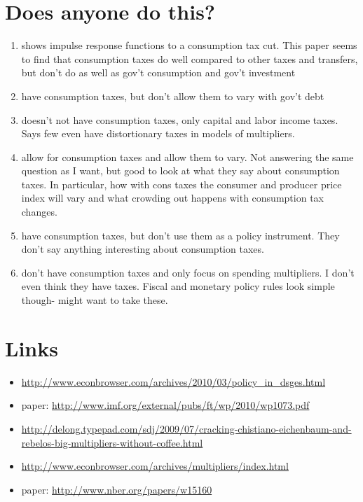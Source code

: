 \documentclass[article,11pt,letterpaper,fleqn]{article}
\theoremstyle{definition}
\numberwithin{equation}{section}
\newcommand{\cn}{\citeasnoun} %
\begin{document}
\section{Does anyone do this?}
\begin{enumerate}
\item \cn{IMF2010} shows impulse response functions to a consumption tax cut.  This paper seems to find that consumption taxes do well compared to other taxes and transfers, but don't do as well as gov't consumption and gov't investment
\item \cn{LPT2010} have consumption taxes, but don't allow them to vary with gov't debt
\item \cn{Zubairy2010} doesn't not have consumption taxes, only capital and labor income taxes.  Says few even have distortionary taxes in models of multipliers.
\item \cn{TY2010} allow for consumption taxes and allow them to vary.  Not answering the same question as I want, but good to look at what they say about consumption taxes.  In particular, how with cons taxes the consumer and producer price index will vary and what crowding out happens with consumption tax changes.
\item \cn{SC2005} have consumption taxes, but don't use them as a policy instrument.  They don't say anything interesting about consumption taxes.
\item \cn{CER2010} don't have consumption taxes and only focus on spending multipliers.  I don't even think they have taxes.  Fiscal and monetary policy rules look simple though- might want to take these.
\end{enumerate}


\section{Links}
\begin{itemize}
\item \url{http://www.econbrowser.com/archives/2010/03/policy_in_dsges.html}
\item \cn{IMF2010} paper: \url{http://www.imf.org/external/pubs/ft/wp/2010/wp1073.pdf}
\item \url{http://delong.typepad.com/sdj/2009/07/cracking-chistiano-eichenbaum-and-rebelos-big-multipliers-without-coffee.html}
\item \url{http://www.econbrowser.com/archives/multipliers/index.html}
\item \cn{TY2010} paper: \url{http://www.nber.org/papers/w15160}
\end{itemize}
\end{document}
